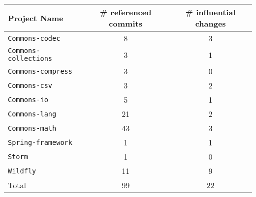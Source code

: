 \centering
\resizebox{0.6\linewidth}{!}
{
\begin{tabular}{lcc}
    Project Name & \# referenced commits & \# influential changes\\
\toprule

{\tt Commons-codec} & 8 & 3 \\
{\tt Commons-collections} & 3 & 1 \\
{\tt Commons-compress} & 3 & 0 \\
{\tt Commons-csv} & 3 & 2 \\
{\tt Commons-io} & 5 & 1 \\
{\tt Commons-lang} & 21 & 2 \\
{\tt Commons-math} & 43 & 3 \\
{\tt Spring-framework} & 1 & 1 \\
{\tt Storm} & 1 & 0 \\
{\tt Wildfly} & 11 & 9 \\
\midrule
Total & 99 & 22 \\
\bottomrule

\end{tabular}
}
